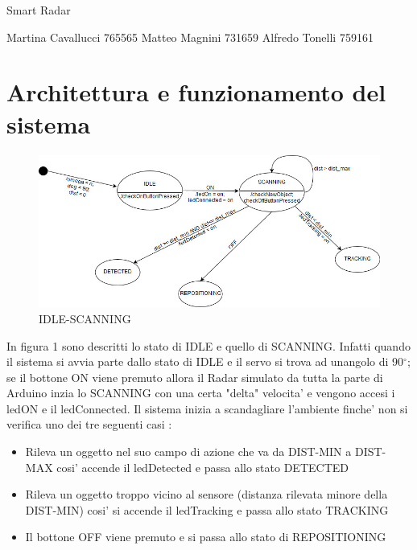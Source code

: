 \documentclass[a4paper]{article}
\begin{document}
	\begin{center}{\Huge \centering  Smart Radar }
			\end{center}
	{\fontsize{10}{12} Martina Cavallucci  765565
		\newline Matteo Magnini      731659
		\newline Alfredo Tonelli 759161
	}
	
	\section{Architettura e funzionamento del sistema}
	   
	\begin{figure}[!htb]
		\centering
			\includegraphics[scale=0.5]{figura1.jpg}
		\caption{IDLE-SCANNING}
	\end{figure}

In figura 1 sono descritti lo stato di IDLE  e quello di SCANNING. Infatti quando il sistema si avvia parte dallo stato di IDLE e il servo si trova ad un\newline angolo di 90$^{\circ}$; se il bottone ON viene premuto allora il Radar simulato da tutta la parte di Arduino inzia lo SCANNING con una certa "delta" velocita' e \newline vengono accesi i ledON e il ledConnected. \newline
Il sistema inizia a scandagliare l'ambiente finche' non si verifica uno dei tre seguenti casi :
\begin{itemize}
	\item Rileva un oggetto nel suo campo di azione che va da DIST-MIN a DIST-MAX cosi' accende il ledDetected e passa allo stato DETECTED
	\item Rileva un oggetto troppo vicino al sensore (distanza rilevata minore della DIST-MIN) cosi' si accende il ledTracking e passa allo stato TRACKING 
	\item Il bottone OFF viene premuto e si passa allo stato di REPOSITIONING
\end{itemize}
\end{document}
